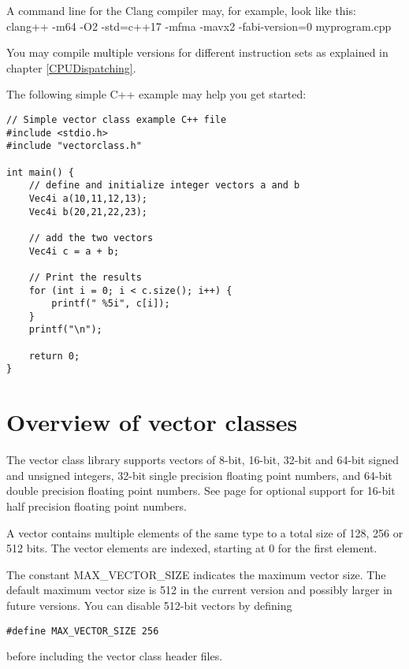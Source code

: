 \documentclass[vcl_manual.tex]{subfiles}
\begin{document}
A command line for the Clang compiler may, for example, look like this:\\
clang++ -m64 -O2 -std=c++17 -mfma -mavx2 -fabi-version=0 myprogram.cpp

You may compile multiple versions for different instruction sets as explained in chapter \ref{CPUDispatching}.


The following simple C++ example may help you get started:

\begin{example}
\label{exampleArrayLoop3}
\end{example} 
\begin{lstlisting}[frame=single]
// Simple vector class example C++ file
#include <stdio.h>
#include "vectorclass.h"

int main() {
    // define and initialize integer vectors a and b
    Vec4i a(10,11,12,13);
    Vec4i b(20,21,22,23);

    // add the two vectors
    Vec4i c = a + b;

    // Print the results
    for (int i = 0; i < c.size(); i++) {
        printf(" %5i", c[i]);
    }
    printf("\n");

    return 0;
}
\end{lstlisting}

\section{Overview of vector classes} \label{OverviewOfVectorClasses}
The vector class library supports vectors of 8-bit, 16-bit, 32-bit and 64-bit signed and unsigned integers, 32-bit single precision floating point numbers, and 64-bit double precision floating point numbers. See page \pageref{HalfPrecision} for optional support for 16-bit half precision floating point numbers. 

A vector contains multiple elements of the same type to a total size of 128, 256 or 512 bits. The vector elements are indexed, starting at 0 for the first element.

The constant MAX\_VECTOR\_SIZE indicates the maximum vector size. The default maximum vector size is 512 in the current version and possibly larger in future versions. You can disable 512-bit vectors by defining
\begin{lstlisting}[frame=none]
    #define MAX_VECTOR_SIZE 256
\end{lstlisting}
before including the vector class header files.
\end{document}
